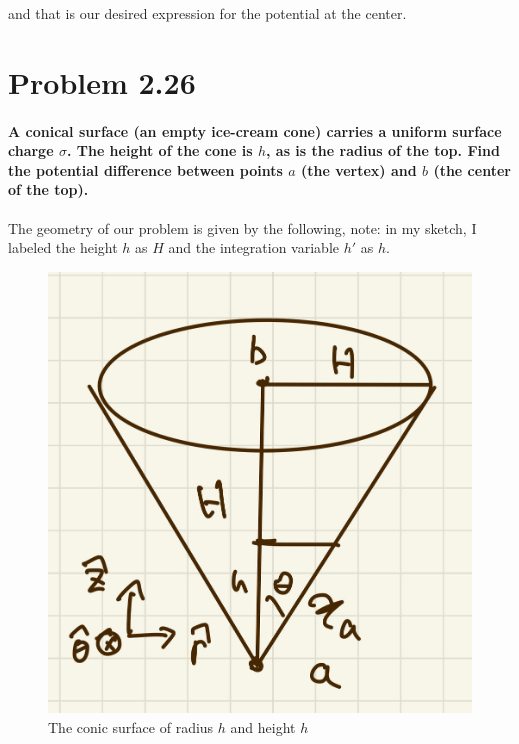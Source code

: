 \documentclass{article}
\numberwithin{equation}{section}
\numberwithin{figure}{section}
\begin{document}
and that is our desired expression for the potential at the center.


\section{Problem 2.26}

\paragraph{A conical surface (an empty ice-cream cone) carries a uniform surface charge $\sigma$. The height of the cone is $h$, as is the radius of the top. Find the
potential difference between points $a$ (the vertex) and $b$ (the center of the top). \\}

The geometry of our problem is given by the following, note: in my sketch, I labeled the height $h$ as $H$ and the integration variable $h'$ as $h$.

\begin{figure}[!htb]
    \centering
   \begin{minipage}{0.48\textwidth}
     \includegraphics[width=1\linewidth]{hw/hw2/7.1.jpg}
     \caption{The conic surface of radius $h$ and height $h$}
   \end{minipage}
\end{figure}
\end{document}
